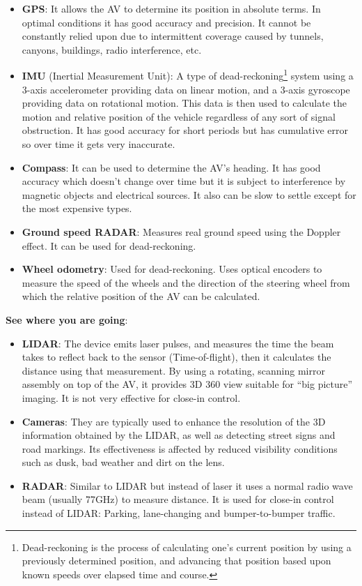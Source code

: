 \documentclass[11pt]{article}
\begin{document}
		\begin{itemize}
			\item \textbf{GPS}: It allows the AV to determine its position in absolute terms. In optimal conditions it has good accuracy and precision. It cannot be constantly relied upon due to intermittent coverage caused by tunnels, canyons, buildings, radio interference, etc. \cite{SchweberMouser}
			\item \textbf{IMU} (Inertial Measurement Unit): A type of dead-reckoning\footnote{Dead-reckoning is the process of calculating one's current position by using a previously determined position, and advancing that position based upon known speeds over elapsed time and course.} system using a 3-axis accelerometer providing data on linear motion, and a 3-axis gyroscope providing data on rotational motion. This data is then used to calculate the motion and relative position of the vehicle regardless of any sort of signal obstruction. It has good accuracy for short periods but has cumulative error so over time it gets very inaccurate.\cite{SchweberMouser}\cite{HellstromUmea}
			\item \textbf{Compass}: It can be used to determine the AV's heading. It has good accuracy which doesn't change over time but it is subject to interference by magnetic objects and electrical sources. It also can be slow to settle except for the most expensive types.\cite{HellstromUmea}\cite{BeesonTexas09}
			\item \textbf{Ground speed RADAR}: Measures real ground speed using the Doppler effect. It can be used for dead-reckoning.\cite{HellstromUmea}
			\item \textbf{Wheel odometry}: Used for dead-reckoning. Uses optical encoders to measure the speed of the wheels and the direction of the steering wheel from which the relative position of the AV can be calculated.\cite{HellstromUmea}\cite{BeesonTexas09}
		\end{itemize}
\textbf{See where you are going}:
		\begin{itemize}
			\item \textbf{LIDAR}: The device emits laser pulses, and measures the time the beam takes to reflect back to the sensor (Time-of-flight), then it calculates the distance using that measurement. By using a rotating, scanning mirror assembly on top of the AV, it provides 3D 360{\textdegree} view suitable for ``big picture'' imaging. It is not very effective for close-in control.\cite{SchweberMouser}\cite{BeesonTexas09}
			\item \textbf{Cameras}: They are typically used to enhance the resolution of the 3D information obtained by the LIDAR, as well as detecting street signs and road markings. Its effectiveness is affected by reduced visibility conditions such as dusk, bad weather and dirt on the lens.\cite{SchweberMouser}\cite{HellstromUmea}
			\item \textbf{RADAR}: Similar to LIDAR but instead of laser it uses a normal radio wave beam (usually 77GHz) to measure distance. It is used for close-in control instead of LIDAR: Parking, lane-changing and bumper-to-bumper traffic.\cite{SchweberMouser}\cite{BeesonTexas09}\cite{HellstromUmea}
		\end{itemize}
\end{document}
